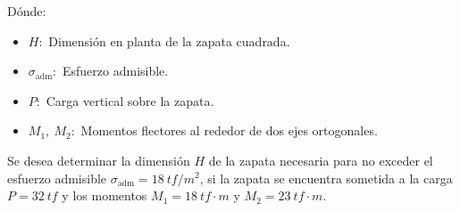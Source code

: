 \begin{enumerate}
Dónde:

\begin{itemize}
	\item $H:$ Dimensión en planta de la zapata cuadrada.
	\item $\sigma_\text{adm}:$ Esfuerzo admisible.
	\item $P:$ Carga vertical sobre la zapata.
	\item $M_1, \ M_2:$ Momentos flectores al rededor de dos ejes ortogonales.
\end{itemize}

Se desea determinar la dimensión $H$ de la zapata necesaria para no exceder el esfuerzo admisible $\sigma_\text{adm}= 18 \ \unit{tf}/\unit{m}^2$, si la zapata se encuentra sometida a la carga $P=32 \ \unit{tf}$ y los momentos $M_1= 18 \ \unit{tf}\cdot\unit{m}$ y $M_2= 23 \ \unit{tf}\cdot\unit{m}$.

\end{enumerate}